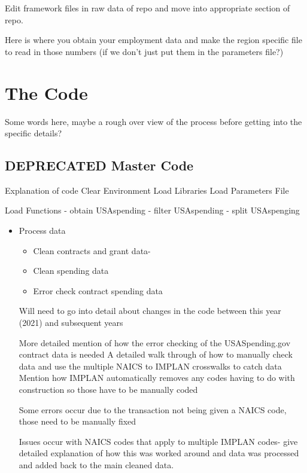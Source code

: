 \documentclass[
]{book}
\providecommand{\tightlist}{%
  \setlength{\itemsep}{0pt}\setlength{\parskip}{0pt}}
\begin{document}
Edit framework files in raw data of repo and move into appropriate section of repo.

Here is where you obtain your employment data and make the region specific file to read in those numbers (if we don't just put them in the parameters file?)

\hypertarget{the-code}{%
\section{The Code}\label{the-code}}

Some words here, maybe a rough over view of the process before getting into the specific details?

\hypertarget{deprecated-master-code}{%
\subsection{DEPRECATED Master Code}\label{deprecated-master-code}}

Explanation of code
Clear Environment
Load Libraries
Load Parameters File

Load Functions
- obtain USAspending
- filter USAspending
- split USAspenging

\begin{itemize}
\item
  Process data

  \begin{itemize}
  \tightlist
  \item
    Clean contracts and grant data-
  \item
    Clean spending data
  \item
    Error check contract spending data
  \end{itemize}

  Will need to go into detail about changes in the code between this year (2021) and subsequent years

  More detailed mention of how the error checking of the USASpending.gov contract data is needed
  A detailed walk through of how to manually check data and use the multiple NAICS to IMPLAN crosswalks to catch data
  Mention how IMPLAN automatically removes any codes having to do with construction so those have to be manually coded

  Some errors occur due to the transaction not being given a NAICS code, those need to be manually fixed

  Issues occur with NAICS codes that apply to multiple IMPLAN codes- give detailed explanation of how this was worked around and data was processed and added back to the main cleaned data.
\end{itemize}
\end{document}
